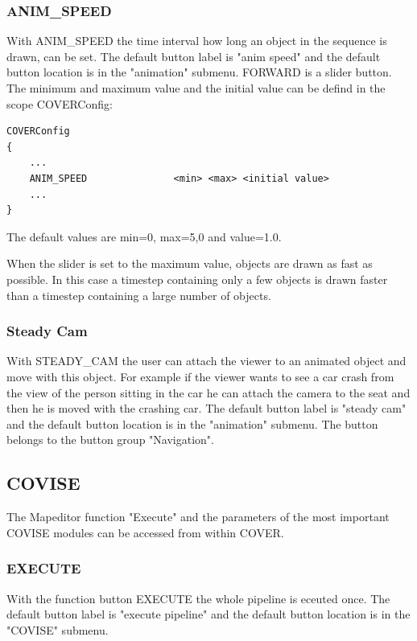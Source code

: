 \subsubsection{ANIM\_SPEED}
With ANIM\_SPEED the time interval how long an object in the sequence
is drawn, can be set.
The default button label is "anim speed" and
the default button location is in the "animation" submenu.  
FORWARD is a slider button. The minimum and maximum value and the initial
value can be defind in the scope COVERConfig:

\begin{samepage}
\begin{verbatim}
COVERConfig
{
    ...
    ANIM_SPEED               <min> <max> <initial value>
    ...
}
\end{verbatim}
\end{samepage}

The default values are min=0, max=5,0 and value=1.0.

When the slider is set to the maximum value, objects are drawn as
fast as possible. In this case a timestep containing only a few objects is drawn
faster than a timestep containing a large number of objects.


\subsubsection{Steady Cam}
With STEADY\_CAM the user can attach the viewer to an animated object and
move with this object. For example if the viewer wants to see a car crash
from the view of the person sitting in the car he can attach the camera
to the seat and then he is moved with the crashing car.
The default button label is "steady cam" and
the default button location is in the "animation" submenu.
The button belongs to the button group "Navigation".
		
		
\subsection{COVISE}

The Mapeditor function "Execute" and the parameters of the most important 
COVISE modules can be accessed from within COVER.

\subsubsection{EXECUTE}
With the function button EXECUTE the whole pipeline is eceuted once.
The default button label is "execute pipeline" and
the default button location is in the "COVISE" submenu.
		
